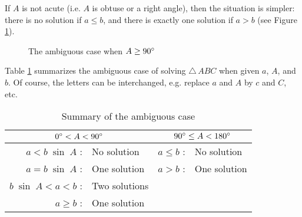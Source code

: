 If $A$ is not acute (i.e. $A$ is obtuse or a right angle), then the situation is simpler: there is
no solution if $a \le b$, and there is exactly one solution if $a > b$ (see Figure
\ref{fig:ambigobtuse}).
\begin{figure}[h]
 \centering
 \qquad\qquad\qquad
 \vspace{-2mm}
 \caption[]{\quad The ambiguous case when $A \ge 90^\circ$}
 \label{fig:ambigobtuse}
\end{figure}\vspace{-1mm}

\noindent Table \ref{tbl:ambiguous} summarizes the ambiguous case of solving $\triangle\,ABC$ when
given $a$, $A$, and $b$. Of course, the letters can be interchanged, e.g. replace $a$ and $A$ by $c$
and $C$, etc.\vspace{-2mm}

\begin{table}[h]\centering
\caption{\quad Summary of the ambiguous case}\vspace{3mm}
\begin{tabular}{@{}|rl||rl|@{}}
 \hline
 \multicolumn{2}{|c||}{$0^\circ < A < 90^\circ$} &
  \multicolumn{2}{c|}{$90^\circ \le A < 180^\circ$}\\
 \hline
 $a < b\;\sin\;A$ : & No solution & $a \le b$ : & No solution\\
 $a = b\;\sin\;A$ : & One solution & $a > b$ : & One solution\\
 $b\;\sin\;A < a < b$ : & Two solutions & & \\
 $a \ge b$ : & One solution & & \\
 \hline
\end{tabular}\label{tbl:ambiguous}
\end{table}

